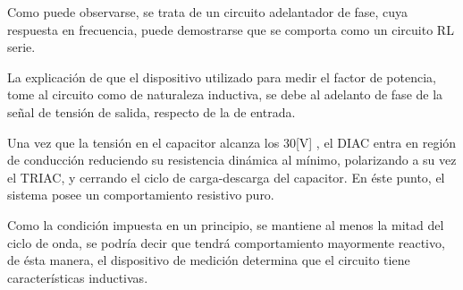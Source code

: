 Como puede observarse, se trata de un circuito adelantador de fase, cuya 
respuesta en frecuencia, puede demostrarse que se comporta como un circuito RL 
serie.

La explicación de que el dispositivo utilizado para medir el factor de potencia, 
tome al circuito como de naturaleza inductiva, se debe al adelanto de fase de la 
señal de tensión de salida, respecto de la de entrada.

Una vez que la tensión en el capacitor alcanza los 30[V] , el DIAC entra en región 
de conducción reduciendo su resistencia dinámica al mínimo, polarizando a su vez el 
TRIAC, y cerrando el ciclo de carga-descarga del capacitor. En éste punto, el sistema 
posee un comportamiento resistivo puro.

Como la condición impuesta en un principio, se mantiene 
al menos la mitad del ciclo de onda, se podría decir que tendrá comportamiento mayormente 
reactivo, de ésta manera, el dispositivo de medición determina que el circuito tiene 
características inductivas.






